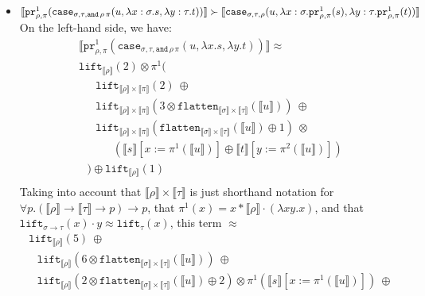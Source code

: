 \documentclass[a4paper,UKenglish,cleveref,autoref,numberwithinsect]{lipics-v2019}
\theoremstyle{definition}
\newcommand{\arrtype}{\rightarrow}
\newcommand{\quant}[2]{\forall #1.#2}
\newcommand{\abs}[2]{\lambda #1.#2}
\newcommand{\flatten}{\mathtt{flatten}}
\newcommand{\lift}{\mathtt{lift}}
\newcommand{\typeinterpret}[1]{\llbracket #1 \rrbracket}
\newcommand{\interpret}[1]{\llbracket #1 \rrbracket}
\newcommand{\proj}{\mathtt{pr}}
\begin{document}
\begin{itemize}
\item $\interpret{\proj^1_{\rho,\pi}(\mathtt{case}_{\sigma,\tau,
  \mathtt{and}\,\rho\,\pi}(u,\abs{x:\sigma}{s},\abs{y:\tau}{t}))} \succ \\
  \interpret{\mathtt{case}_{\sigma,\tau,\rho}(u,\abs{x:\sigma}{
  \proj^1_{\rho,\pi}(s)},\abs{y:\tau}{\proj^1_{\rho,\pi}(t)})}$ \\
  On the left-hand side, we have: \\
  \[
  \begin{array}{l}
  \interpret{\proj^1_{\rho,\pi}(\mathtt{case}_{\sigma,\tau,
  \mathtt{and}\,\rho\,\pi}(u,\abs{x}{s},\abs{y}{t}))} \approx \\
  \lift_{\typeinterpret{\rho}}(2) \otimes \pi^1( \\
  \phantom{AB}
    \lift_{\typeinterpret{\rho} \times \typeinterpret{\pi}}(2)\ \oplus \\
  \phantom{AB}
    \lift_{\typeinterpret{\rho} \times \typeinterpret{\pi}}(3 \otimes
    \flatten_{\typeinterpret{\sigma} \times \typeinterpret{\tau}}(
    \interpret{u}))\ \oplus \\
  \phantom{AB}
    \lift_{\typeinterpret{\rho} \times \typeinterpret{\pi}}(
    \flatten_{\typeinterpret{\sigma} \times \typeinterpret{\tau}}(
    \interpret{u}) \oplus 1)\ \otimes \\
  \phantom{ABCD}
    (\interpret{s}[x:=\pi^1(\interpret{u})] \oplus
     \interpret{t}[y:=\pi^2(\interpret{u})]) \\
  \phantom{A}) \oplus \lift_{\typeinterpret{\rho}}(1) \\
  \end{array}
  \]
  Taking into account that $\typeinterpret{\rho} \times
  \typeinterpret{\tau}$ is just shorthand notation for
  $\quant{p}{(\typeinterpret{\rho} \arrtype \typeinterpret{\tau}
  \arrtype p) \arrtype p}$, that $\pi^1(x) = x * \typeinterpret{\rho}
  \cdot (\abs{xy}{x})$, and that $\lift_{\sigma \arrtype \tau}(x)
  \cdot y \approx \lift_\tau(x)$, this term $\approx$
  \[
  \begin{array}{l}
  \lift_{\typeinterpret{\rho}}(5)\ \oplus \\
  \phantom{A}
    \lift_{\typeinterpret{\rho}}(6 \otimes
    \flatten_{\typeinterpret{\sigma} \times \typeinterpret{\tau}}(
    \interpret{u}))\ \oplus \\
  \phantom{A}
    \lift_{\typeinterpret{\rho}}(2 \otimes
    \flatten_{\typeinterpret{\sigma} \times
    \typeinterpret{\tau}}(\interpret{u}) \oplus 2) \otimes
    \pi^1(\interpret{s}[x:=\pi^1(\interpret{u})])\ \oplus \\

\end{array}\]
\end{itemize}
\end{document}
